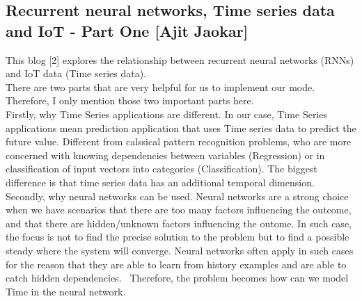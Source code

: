 \documentclass[12pt]{article}
\begin{document}
\subsection{Recurrent neural networks, Time series data and IoT - Part One [Ajit Jaokar]}
This blog [2] explores the relationship between recurrent neural networks (RNNs) and IoT data (Time series data). \\
There are two parts that are very helpful for us to implement our mode. Therefore, I only mention those two important parts here. \\ Firstly, why Time Series applications are different. In our case, Time Series applications mean prediction application that uses Time series data to predict the future value. Different from calssical pattern recognition problems, who are more concerned with knowing dependencies between variables (Regression) or in classification of input vectors into categories (Classification). The biggest difference is that time series data has an additional temporal dimension. \\ Secondly, why neural networks can be used. Neural networks are a strong choice when we have scenarios that there are too many factors influencing the outcome, and that there are hidden/unknown factors influencing the outome. In such case, the focus is not to find the precise solution to the problem but to find a possible steady where the system will converge. Neural networks often apply in such cases for the reason that they are able to learn from history examples and are able to catch hidden dependencies. \ Therefore, the problem becomes how can we model Time in the neural network.
\end{document}
